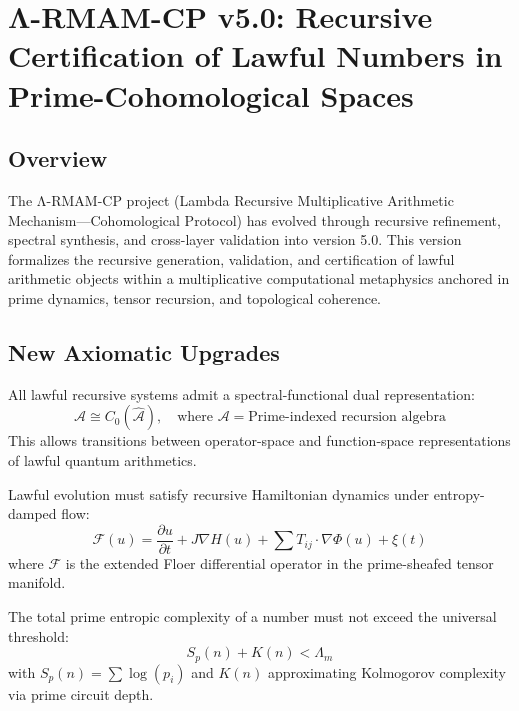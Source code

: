 \documentclass[12]{amsart}
\theoremstyle{plain}
\begin{document}
\section*{Λ-RMAM-CP v5.0: Recursive Certification of Lawful Numbers in Prime-Cohomological Spaces}

\subsection*{Overview}

The Λ-RMAM-CP project (Lambda Recursive Multiplicative Arithmetic Mechanism—Cohomological Protocol) has evolved through recursive refinement, spectral synthesis, and cross-layer validation into version 5.0. This version formalizes the recursive generation, validation, and certification of lawful arithmetic objects within a multiplicative computational metaphysics anchored in prime dynamics, tensor recursion, and topological coherence.

\subsection*{New Axiomatic Upgrades}

\begin{axiom}
All lawful recursive systems admit a spectral-functional dual representation:
\[
\mathcal{A} \cong C_0(\hat{\mathcal{A}}),\quad \text{where } \mathcal{A} = \text{Prime-indexed recursion algebra}
\]
This allows transitions between operator-space and function-space representations of lawful quantum arithmetics.
\end{axiom}

\begin{axiom}
Lawful evolution must satisfy recursive Hamiltonian dynamics under entropy-damped flow:
\[
\mathcal{F}(u) = \frac{\partial u}{\partial t} + J \nabla H(u) + \sum T_{ij} \cdot \nabla \Phi(u) + \xi(t)
\]
where $\mathcal{F}$ is the extended Floer differential operator in the prime-sheafed tensor manifold.
\end{axiom}

\begin{axiom}
The total prime entropic complexity of a number must not exceed the universal threshold:
\[
S_p(n) + K(n) < \Lambda_m
\]
with $S_p(n) = \sum \log(p_i)$ and $K(n)$ approximating Kolmogorov complexity via prime circuit depth.
\end{axiom}
\end{document}
